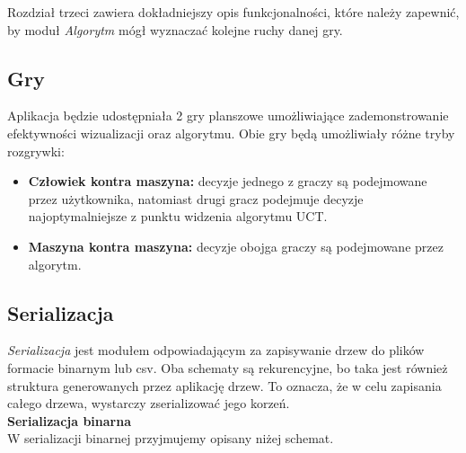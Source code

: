 \documentclass{article}
\newcommand{\modulename}[1]{\textit{#1}}
\begin{document}
	\noindent Rozdział trzeci zawiera dokładniejszy opis funkcjonalności, które należy zapewnić, by moduł \modulename{Algorytm} mógł wyznaczać kolejne ruchy danej gry.
	
%	  
	
	
	\subsection{Gry}
	Aplikacja będzie udostępniała 2 gry planszowe umożliwiające zademonstrowanie efektywności wizualizacji oraz algorytmu. Obie gry będą umożliwiały różne tryby rozgrywki: \\
	
	\begin{itemize}
		\item \textbf{Człowiek kontra maszyna:} decyzje jednego z graczy są podejmowane przez użytkownika, natomiast drugi gracz podejmuje decyzje najoptymalniejsze z punktu widzenia algorytmu UCT.
		\item \textbf{Maszyna kontra maszyna:} decyzje obojga graczy są podejmowane przez algorytm. \\ 
	\end{itemize}
	
	\clearpage
	
	\subsection{Serializacja}
	\modulename{Serializacja} jest modułem odpowiadającym za zapisywanie drzew do plików formacie binarnym lub csv. Oba schematy są rekurencyjne, bo taka jest również struktura generowanych przez aplikację drzew. To oznacza, że w celu zapisania całego drzewa, wystarczy zserializować jego korzeń.\\
	
	\noindent \textbf{\large Serializacja binarna} \\
	W serializacji binarnej przyjmujemy opisany niżej schemat.\\
\end{document}
